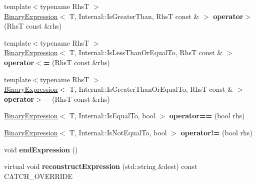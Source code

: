 \begin{DoxyCompactItemize}
\item 
{\footnotesize template$<$typename RhsT $>$ }\\\hyperlink{classCatch_1_1BinaryExpression}{Binary\+Expression}$<$ T, Internal\+::\+Is\+Greater\+Than, RhsT const \& $>$ {\bfseries operator$>$} (RhsT const \&rhs)\hypertarget{classCatch_1_1ExpressionLhs_a52981d92ec6aad872660ae7df1abb33a}{}\label{classCatch_1_1ExpressionLhs_a52981d92ec6aad872660ae7df1abb33a}

\item 
{\footnotesize template$<$typename RhsT $>$ }\\\hyperlink{classCatch_1_1BinaryExpression}{Binary\+Expression}$<$ T, Internal\+::\+Is\+Less\+Than\+Or\+Equal\+To, RhsT const \& $>$ {\bfseries operator$<$=} (RhsT const \&rhs)\hypertarget{classCatch_1_1ExpressionLhs_a1d10974a581c67cc400cd6cdd36b0000}{}\label{classCatch_1_1ExpressionLhs_a1d10974a581c67cc400cd6cdd36b0000}

\item 
{\footnotesize template$<$typename RhsT $>$ }\\\hyperlink{classCatch_1_1BinaryExpression}{Binary\+Expression}$<$ T, Internal\+::\+Is\+Greater\+Than\+Or\+Equal\+To, RhsT const \& $>$ {\bfseries operator$>$=} (RhsT const \&rhs)\hypertarget{classCatch_1_1ExpressionLhs_a3387a494cb6b699a6c0162c79f7f533c}{}\label{classCatch_1_1ExpressionLhs_a3387a494cb6b699a6c0162c79f7f533c}

\item 
\hyperlink{classCatch_1_1BinaryExpression}{Binary\+Expression}$<$ T, Internal\+::\+Is\+Equal\+To, bool $>$ {\bfseries operator==} (bool rhs)\hypertarget{classCatch_1_1ExpressionLhs_ab803185079504a65b0af95f7c9669351}{}\label{classCatch_1_1ExpressionLhs_ab803185079504a65b0af95f7c9669351}

\item 
\hyperlink{classCatch_1_1BinaryExpression}{Binary\+Expression}$<$ T, Internal\+::\+Is\+Not\+Equal\+To, bool $>$ {\bfseries operator!=} (bool rhs)\hypertarget{classCatch_1_1ExpressionLhs_a1f3ff934880623f12a4cbd9725397ccf}{}\label{classCatch_1_1ExpressionLhs_a1f3ff934880623f12a4cbd9725397ccf}

\item 
void {\bfseries end\+Expression} ()\hypertarget{classCatch_1_1ExpressionLhs_a13d2551a927790284fb5ddf1ee2c9079}{}\label{classCatch_1_1ExpressionLhs_a13d2551a927790284fb5ddf1ee2c9079}

\item 
virtual void {\bfseries reconstruct\+Expression} (std\+::string \&dest) const C\+A\+T\+C\+H\+\_\+\+O\+V\+E\+R\+R\+I\+DE\hypertarget{classCatch_1_1ExpressionLhs_a7684a053e8e88a4be475a536252630da}{}\label{classCatch_1_1ExpressionLhs_a7684a053e8e88a4be475a536252630da}

\end{DoxyCompactItemize}


